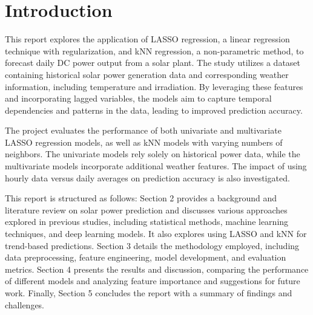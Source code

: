 \section{Introduction}
This report explores the application of LASSO regression, a linear regression technique with regularization, and kNN regression, a non-parametric method, to forecast daily DC power output from a solar plant. The study utilizes a dataset containing historical solar power generation data and corresponding weather information, including temperature and irradiation. By leveraging these features and incorporating lagged variables, the models aim to capture temporal dependencies and patterns in the data, leading to improved prediction accuracy.

The project evaluates the performance of both univariate and multivariate LASSO regression models, as well as kNN models with varying numbers of neighbors. The univariate models rely solely on historical power data, while the multivariate models incorporate additional weather features. The impact of using hourly data versus daily averages on prediction accuracy is also investigated.

This report is structured as follows: Section 2 provides a background and literature review on solar power prediction and discusses various approaches explored in previous studies, including statistical methods, machine learning techniques, and deep learning models. It also explores using LASSO and kNN for trend-based predictions. Section 3 details the methodology employed, including data preprocessing, feature engineering, model development, and evaluation metrics. Section 4 presents the results and discussion, comparing the performance of different models and analyzing feature importance and suggestions for future work. Finally, Section 5 concludes the report with a summary of findings and challenges.